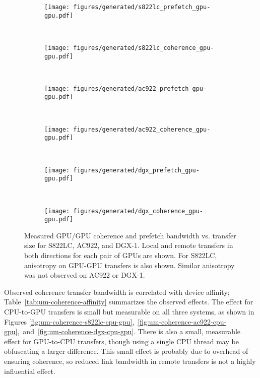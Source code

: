 \begin{figure}[H]
	\centering
	\begin{subfigure}[b]{0.45\textwidth}
		\texttt{[image: figures/generated/s822lc\_prefetch\_gpu-gpu.pdf]}
		\caption{}
		\label{fig:um-prefetch-s822lc-gpu-gpu}
	\end{subfigure}
	~
	\begin{subfigure}[b]{0.45\textwidth}
		\texttt{[image: figures/generated/s822lc\_coherence\_gpu-gpu.pdf]}
		\caption{}
		\label{fig:um-coherence-s822lc-gpu-gpu}
	\end{subfigure}
	\\
	\begin{subfigure}[b]{0.45\textwidth}
		\texttt{[image: figures/generated/ac922\_prefetch\_gpu-gpu.pdf]}
		\caption{}
		\label{fig:um-prefetch-ac922-gpu-gpu}
	\end{subfigure}
	~
	\begin{subfigure}[b]{0.45\textwidth}
		\texttt{[image: figures/generated/ac922\_coherence\_gpu-gpu.pdf]}
		\caption{}
		\label{fig:um-coherence-ac922-gpu-gpu}
	\end{subfigure}
	\\
	\begin{subfigure}[b]{0.45\textwidth}
		\texttt{[image: figures/generated/dgx\_prefetch\_gpu-gpu.pdf]}
		\caption{}
		\label{fig:um-prefetch-dgx-gpu-gpu}
	\end{subfigure}
	~
	\begin{subfigure}[b]{0.45\textwidth}
		\texttt{[image: figures/generated/dgx\_coherence\_gpu-gpu.pdf]}
		\caption{}
		\label{fig:um-coherence-dgx-gpu-gpu}
	\end{subfigure}
	\caption[GPU/GPU coherence and prefetch bandwidth]{
		Measured GPU/GPU coherence and prefetch bandwidth vs. transfer size for S822LC, AC922, and DGX-1.
		Local and remote transfers in both directions for each pair of GPUs are shown.
		For S822LC, anisotropy on GPU-GPU transfers is also shown.
		Similar anisotropy was not observed on AC922 or DGX-1.
	}
	\label{fig:um-gpu-gpu}
\end{figure}

Observed coherence transfer bandwidth is correlated with device affinity; Table~\ref{tab:um-coherence-affinity} summarizes the observed effects.
The effect for CPU-to-GPU transfers is small but measurable on all three systems, as shown in Figures \ref{fig:um-coherence-s822lc-cpu-gpu},~\ref{fig:um-coherence-ac922-cpu-gpu},~and~\ref{fig:um-coherence-dgx-cpu-gpu}.
There is also a small, measurable effect for GPU-to-CPU transfers, though using a single CPU thread may be obfuscating a larger difference.
This small effect is probably due to overhead of ensuring coherence, so reduced link bandwidth in remote transfers is not a highly influential effect.

